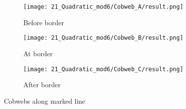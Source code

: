 \begin{figure}
    \centering
    \begin{subfigure}{0.3\textwidth}
        \centering
        \texttt{[image: 21\_Quadratic\_mod6/Cobweb\_A/result.png]}
        \caption{Before border}
        \label{fig:quad.full.CobwebA}
    \end{subfigure}
    \begin{subfigure}{0.3\textwidth}
        \centering
        \texttt{[image: 21\_Quadratic\_mod6/Cobweb\_B/result.png]}
        \caption{At border}
        \label{fig:quad.full.CobwebB}
    \end{subfigure}
    \begin{subfigure}{0.3\textwidth}
        \centering
        \texttt{[image: 21\_Quadratic\_mod6/Cobweb\_C/result.png]}
        \caption{After border}
        \label{fig:quad.full.CobwebC}
    \end{subfigure}
    \caption{Cobwebs along marked line}
    \label{fig:quad.full.Cobwebs}
\end{figure}
